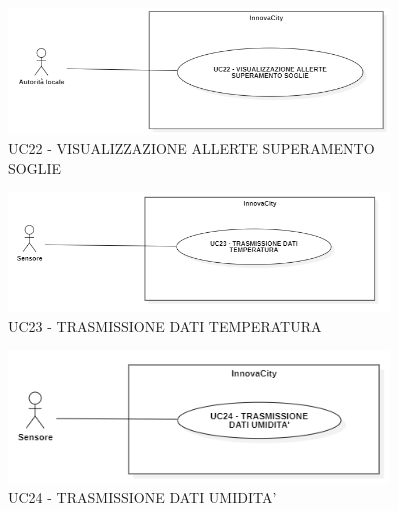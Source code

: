 
\begin{figure}[H]
    \centering
    \includegraphics[width=0.9\textwidth]{../Images/uc22.PNG}
    \caption{UC22 - VISUALIZZAZIONE ALLERTE SUPERAMENTO SOGLIE }
\end{figure}



\begin{figure}[H]
    \centering
    \includegraphics[width=0.9\textwidth]{../Images/uc23.PNG}
    \caption{UC23 - TRASMISSIONE DATI TEMPERATURA }
\end{figure}



\begin{figure}[H]
    \centering
    \includegraphics[width=0.9\textwidth]{../Images/uc24.PNG}
    \caption{UC24 - TRASMISSIONE DATI UMIDITA' }
\end{figure}


